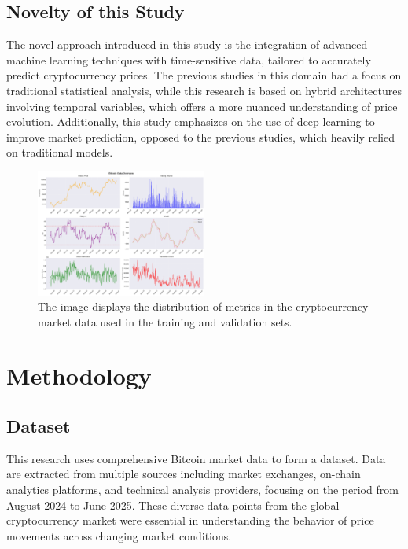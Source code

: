 \documentclass[conference]{IEEEtran}
\begin{document}
\subsection{Novelty of this Study}

The novel approach introduced in this study is the integration of advanced machine learning techniques with time-sensitive data, tailored to accurately predict cryptocurrency prices. The previous studies in this domain had a focus on traditional statistical analysis, while this research is based on hybrid architectures involving temporal variables, which offers a more nuanced understanding of price evolution. Additionally, this study emphasizes on the use of deep learning to improve market prediction, opposed to the previous studies, which heavily relied on traditional models.

\begin{figure}[htbp]
\centerline{\includegraphics[width=0.5\textwidth]{figures/data_overview.png}}
\caption{The image displays the distribution of metrics in the cryptocurrency market data used in the training and validation sets.}
\label{fig:data_overview}
\end{figure}

\section{Methodology}

\subsection{Dataset}

This research uses comprehensive Bitcoin market data to form a dataset. Data are extracted from multiple sources including market exchanges, on-chain analytics platforms, and technical analysis providers, focusing on the period from August 2024 to June 2025. These diverse data points from the global cryptocurrency market were essential in understanding the behavior of price movements across changing market conditions.
\end{document}
